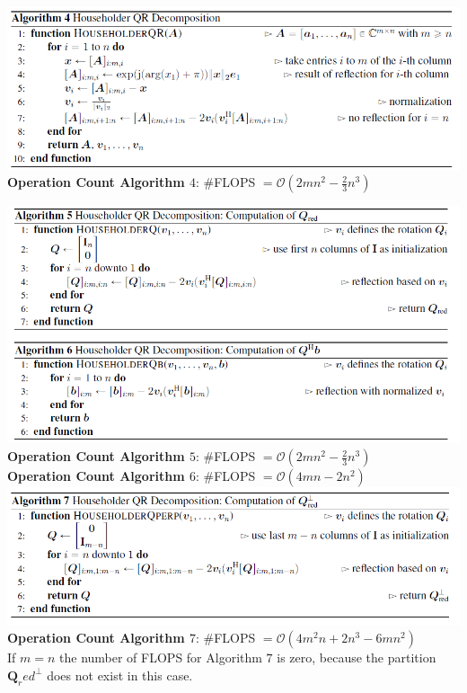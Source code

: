 \documentclass[english]{latex4ei/latex4ei_sheet}
\begin{document}
\begin{sectionbox}
\includegraphics[width=\textwidth]{img/householder_QR.png}
\textbf{Operation Count Algorithm $4$}: \#FLOPS $=\mathcal{O}(2mn^2 - \frac{2}{3}n^3)$
\end{sectionbox}
\begin{sectionbox}

\includegraphics[width=\textwidth]{img/householder_QR_further.png}\\

\textbf{Operation Count Algorithm $5$}: \#FLOPS $=\mathcal{O}(2mn^2-\frac{2}{3}n^3)$\\

\textbf{Operation Count Algorithm $6$}: \#FLOPS $=\mathcal{O}(4mn-2n^2)$\\

\includegraphics[width=\textwidth]{img/householder_QR_Qperp.png}\\

\textbf{Operation Count Algorithm $7$}: \#FLOPS $=\mathcal{O}(4m^2n+2n^3-6mn^2)$\\
If $m=n$ the number of FLOPS for Algorithm $7$ is zero, because the partition $\mathbf{Q}_red^\perp$ does not exist in this case.
\end{sectionbox}
\end{document}
